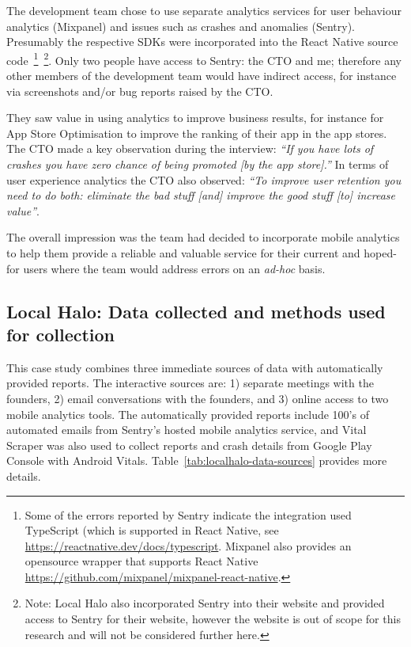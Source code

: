 The development team chose to use separate analytics services for user behaviour analytics (Mixpanel) and issues such as crashes and anomalies (Sentry). Presumably the respective SDKs were incorporated into the React Native source code~\footnote{Some of the errors reported by Sentry indicate the integration used TypeScript (which is supported in React Native, see \url{https://reactnative.dev/docs/typescript}. Mixpanel also provides an opensource wrapper that supports React Native \url{https://github.com/mixpanel/mixpanel-react-native}.}~\footnote{Note: Local Halo also incorporated Sentry into their website and provided access to Sentry for their website, however the website is out of scope for this research and will not be considered further here.}. Only two people have access to Sentry: the CTO and me; therefore any other members of the development team would have indirect access, for instance via screenshots and/or bug reports raised by the CTO. 

They saw value in using analytics to improve business results, for instance for App Store Optimisation to improve the ranking of their app in the app stores. The CTO made a key observation during the interview: \emph{``If you have lots of crashes you have zero chance of being promoted [by the app store].''}
%
In terms of user experience analytics the CTO also observed: \emph{``To improve user retention you need to do both: eliminate the bad stuff [and] improve the good stuff [to] increase value''}.

The overall impression was the team had decided to incorporate mobile analytics to help them provide a reliable and valuable service for their current and hoped-for users where the team would address errors on an \emph{ad-hoc} basis.


\subsection{Local Halo: Data collected and methods used for collection}
This case study combines three immediate sources of data with automatically provided reports. The interactive sources are: 1) separate meetings with the founders, 2) email conversations with the founders, and 3) online access to two mobile analytics tools. The automatically provided reports include 100's of automated emails from Sentry's hosted mobile analytics service, and Vital Scraper was also used to collect reports and crash details from Google Play Console with Android Vitals. Table~\ref{tab:localhalo-data-sources} provides more details.

